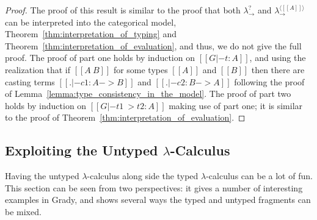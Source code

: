 \begin{proof}
  The proof of this result is similar to the proof that both
  $\lambda^?_\to$ and $\lambda^{\langle [[A]] \rangle}_\to$ can be
  interpreted into the categorical model,
  Theorem~\ref{thm:interpretation_of_typing} and
  Theorem~\ref{thm:interpretation_of_evaluation}, and thus, we do not
  give the full proof.  The proof of part one holds by induction on
  $[[G |- t : A]]$, and using the realization that if $[[A ~ B]]$ for
  some types $[[A]]$ and $[[B]]$ then there are casting terms $[[. |-
      c1 : A -> B]]$ and $[[. |- c2 : B -> A]]$ following the proof of
  Lemma~\ref{lemma:type_consistency_in_the_model}. The proof of part
  two holds by induction on $[[G |- t1 ~> t2 : A]]$ making use of part
  one; it is similar to the proof of
  Theorem~\ref{thm:interpretation_of_evaluation}.
\end{proof}

\subsection{Exploiting the Untyped $\lambda$-Calculus}
\label{subsec:exploiting_the_untyped_lambda-calculus}
Having the untyped $\lambda$-calculus along side the typed
$\lambda$-calculus can be a lot of fun.  This section can be seen from
two perspectives: it gives a number of interesting examples in Grady,
and shows several ways the typed and untyped fragments can be mixed.

